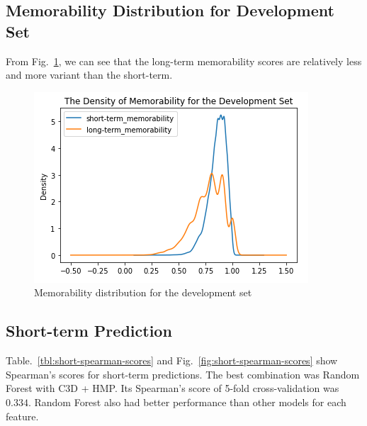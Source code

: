 \documentclass[conference, compsoc]{IEEEtran}
\begin{document}
{\subsection{Memorability Distribution for Development Set}
From Fig.~\ref{fig:dev-set-memo-distribution}, we can see that the long-term memorability scores are relatively less and more variant than the short-term.

\begin{figure}[htbp]
    \centerline{\includegraphics[width=\linewidth]{figures/dev-set-memo-distribution.png}}
    \caption{Memorability distribution for the development set}
    \label{fig:dev-set-memo-distribution}
\end{figure}

\subsection{Short-term Prediction}
Table.~\ref{tbl:short-spearman-scores} and Fig.~\ref{fig:short-spearman-scores} show Spearman's scores for short-term predictions.
The best combination was Random Forest with C3D + HMP. Its Spearman's score of 5-fold cross-validation was $0.334$.
Random Forest also had better performance than other models for each feature.

}
\end{document}
